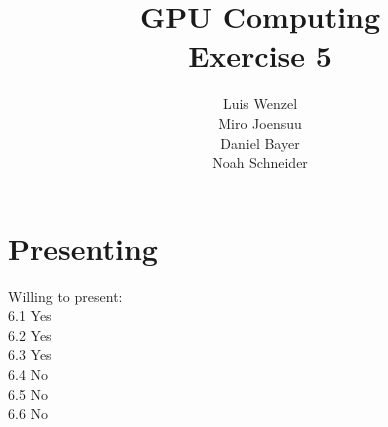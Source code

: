 \documentclass[12pt,twoside,a4paper]{article}
\title{GPU Computing\\
Exercise 5}
\author{
  Luis Wenzel\\
  Miro Joensuu\\
  Daniel Bayer\\
  Noah Schneider
}
\date{}
\begin{document}
\maketitle

\section{Presenting}
Willing to present:\\
6.1 Yes\\
6.2 Yes\\
6.3 Yes\\
6.4 No\\
6.5 No\\
6.6 No\\

\FloatBarrier
	
\FloatBarrier

\FloatBarrier

\FloatBarrier

\FloatBarrier

\FloatBarrier
\end{document}
